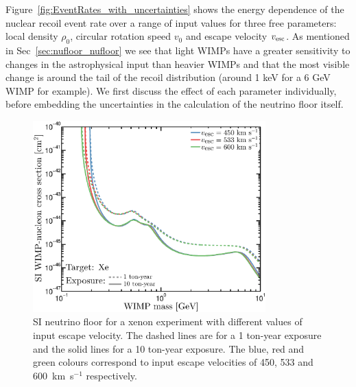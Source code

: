 Figure~\ref{fig:EventRates_with_uncertainties} shows the energy dependence of the nuclear recoil event rate over a range of input values for three free parameters: local density $\rho_0$, circular rotation speed $v_0$ and escape velocity $v_{\rm esc}$. As mentioned in Sec~\ref{sec:nufloor_nufloor} we see that light WIMPs have a greater sensitivity to changes in the astrophysical input than heavier WIMPs and that the most visible change is around the tail of the recoil distribution (around 1 keV for a 6 GeV WIMP for example). We first discuss the effect of each parameter individually, before embedding the uncertainties in the calculation of the neutrino floor itself.

\begin{figure}
\begin{center}
\includegraphics[trim = 0mm 0 0mm 0mm, clip, width=0.8\textwidth,angle=0]{Figures/DL_vesc.eps}
\caption[Neutrino floor with different values of input escape velocity]{SI neutrino floor for a xenon experiment with different values of input escape velocity. The dashed lines are for a 1 ton-year exposure and the solid lines for a 10 ton-year exposure. The blue, red and green colours correspond to input escape velocities of 450, 533 and 600~km~s$^{-1}$ respectively.}
\label{fig:DL_vesc}
\end{center}
\end{figure} 
